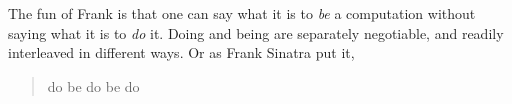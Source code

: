 \documentclass[preprint]{sigplanconf}
\begin{document}
The fun of Frank is that one can say what it is to \emph{be} a
computation without saying what it is to \emph{do} it. Doing and being
are separately negotiable, and readily interleaved in different
ways. Or as Frank Sinatra put it,
\begin{quote}
do be do be do
\end{quote}












\end{document}
